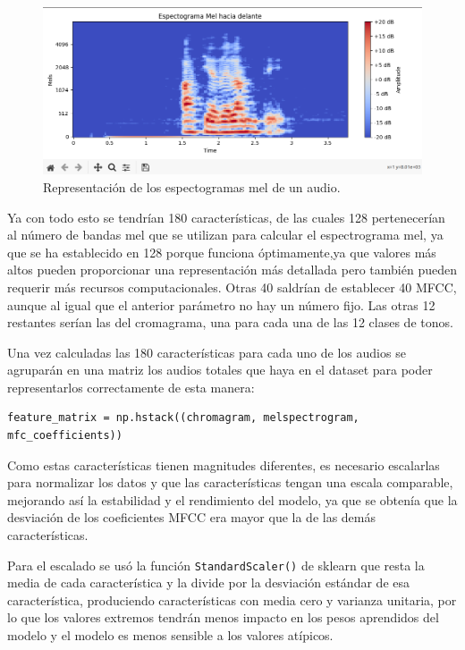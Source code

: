 \begin{figure}[H]
  \centering
  \includegraphics[scale=0.4]{figs/mel_spectrogram} %
  \caption{ Representación de los espectogramas mel de un audio.}
  \label{fig:mel}
\end{figure}

Ya con todo esto se tendrían 180 características, de las cuales 128 pertenecerían al número de bandas mel que se utilizan para calcular el espectrograma mel, ya que se ha establecido en 128 porque funciona óptimamente,ya que valores más altos pueden proporcionar una representación más detallada pero también pueden requerir más recursos computacionales. Otras 40 saldrían de establecer 40 MFCC, aunque al igual que el anterior parámetro no hay un número fijo. Las otras 12 restantes serían las del cromagrama, una para cada una de las 12 clases de tonos.

Una vez calculadas las 180 características para cada uno de los audios se agruparán en una matriz los audios totales que haya en el dataset para poder representarlos correctamente de esta manera:

\begin{verbatim}
feature_matrix = np.hstack((chromagram, melspectrogram, mfc_coefficients))
\end{verbatim}

Como estas características tienen magnitudes diferentes, es necesario escalarlas para normalizar los datos y que las características tengan una escala comparable, mejorando así la estabilidad y el rendimiento del modelo, ya que se obtenía que la desviación de los coeficientes MFCC era mayor que la de las demás características. 

Para el escalado se usó la función \verb|StandardScaler()| de sklearn que resta la media de cada característica y la divide por la desviación estándar de esa característica, produciendo características con media cero y varianza unitaria, por lo que los valores extremos tendrán menos impacto en los pesos aprendidos del modelo y el modelo es menos sensible a los valores atípicos. 

